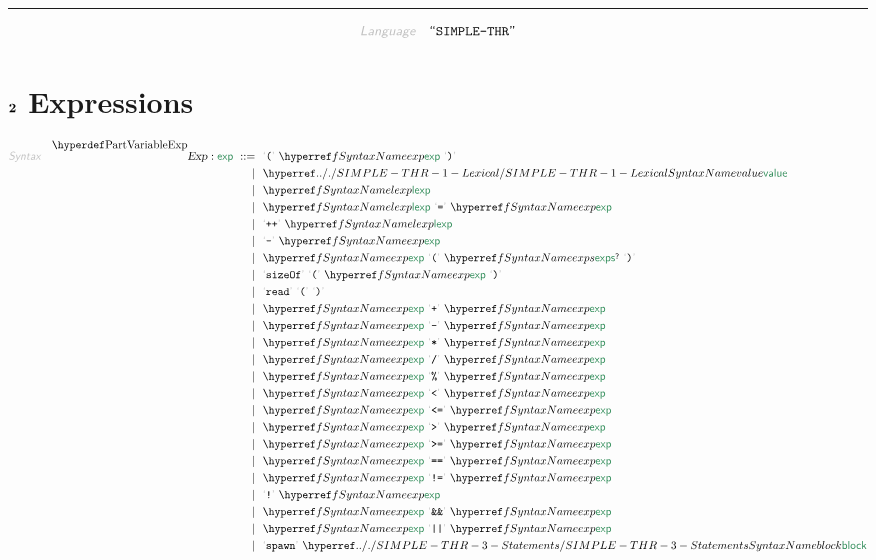 

\begin{center}
\rule{3in}{0.4pt}
\end{center}

\begin{displaymath}
\KEY{Language} \quad \STRING{SIMPLE-THR}
\end{displaymath}

\section{$\SECT{2}$ Expressions}\hypertarget{sect2-expressions}{}\label{sect2-expressions}

\begin{align*}
  \KEY{Syntax} \quad
    \VARDECL{Exp} : \SYN{exp}
      \ ::= \ & \
      \LEX{{(}} \ \SYNREF{exp} \ \LEX{{)}} \\
      \ \mid \ & \ \SYNHYPER{../.}{SIMPLE-THR-1-Lexical}{value} \\
      \ \mid \ & \ \SYNREF{lexp} \\
      \ \mid \ & \ \SYNREF{lexp} \ \LEX{{=}} \ \SYNREF{exp} \\
      \ \mid \ & \ \LEX{{+}{+}} \ \SYNREF{lexp} \\
      \ \mid \ & \ \LEX{{-}} \ \SYNREF{exp} \\
      \ \mid \ & \ \SYNREF{exp} \ \LEX{{(}} \ \SYNREF{exps}\QUERY \ \LEX{{)}} \\
      \ \mid \ & \ \LEX{sizeOf} \ \LEX{{(}} \ \SYNREF{exp} \ \LEX{{)}} \\
      \ \mid \ & \ \LEX{read} \ \LEX{{(}} \ \LEX{{)}} \\
      \ \mid \ & \ \SYNREF{exp} \ \LEX{{+}} \ \SYNREF{exp} \\
      \ \mid \ & \ \SYNREF{exp} \ \LEX{{-}} \ \SYNREF{exp} \\
      \ \mid \ & \ \SYNREF{exp} \ \LEX{{*}} \ \SYNREF{exp} \\
      \ \mid \ & \ \SYNREF{exp} \ \LEX{{/}} \ \SYNREF{exp} \\
      \ \mid \ & \ \SYNREF{exp} \ \LEX{{\PERCENT}} \ \SYNREF{exp} \\
      \ \mid \ & \ \SYNREF{exp} \ \LEX{{<}} \ \SYNREF{exp} \\
      \ \mid \ & \ \SYNREF{exp} \ \LEX{{<}{=}} \ \SYNREF{exp} \\
      \ \mid \ & \ \SYNREF{exp} \ \LEX{{>}} \ \SYNREF{exp} \\
      \ \mid \ & \ \SYNREF{exp} \ \LEX{{>}{=}} \ \SYNREF{exp} \\
      \ \mid \ & \ \SYNREF{exp} \ \LEX{{=}{=}} \ \SYNREF{exp} \\
      \ \mid \ & \ \SYNREF{exp} \ \LEX{{!}{=}} \ \SYNREF{exp} \\
      \ \mid \ & \ \LEX{{!}} \ \SYNREF{exp} \\
      \ \mid \ & \ \SYNREF{exp} \ \LEX{{\AMPERSAND}{\AMPERSAND}} \ \SYNREF{exp} \\
      \ \mid \ & \ \SYNREF{exp} \ \LEX{{|}{|}} \ \SYNREF{exp} \\
      \ \mid \ & \ \LEX{spawn} \ \SYNHYPER{../.}{SIMPLE-THR-3-Statements}{block}
\end{align*}
